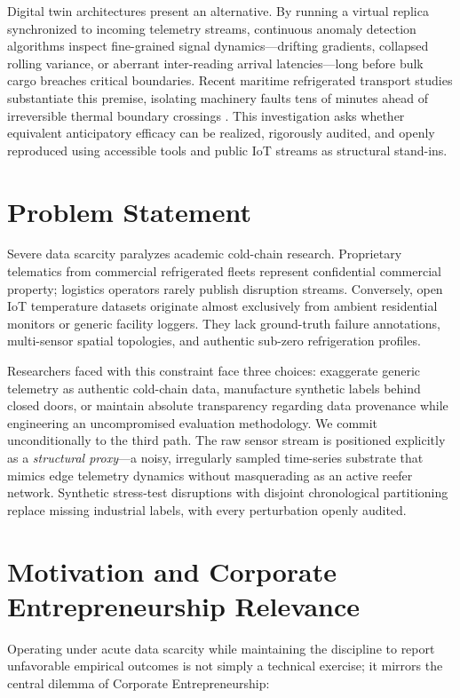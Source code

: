 \documentclass[11pt,a4paper,oneside]{report}
\begin{document}
Digital twin architectures present an alternative. By running a virtual replica synchronized to incoming telemetry streams, continuous anomaly detection algorithms inspect fine-grained signal dynamics---drifting gradients, collapsed rolling variance, or aberrant inter-reading arrival latencies---long before bulk cargo breaches critical boundaries. Recent maritime refrigerated transport studies substantiate this premise, isolating machinery faults tens of minutes ahead of irreversible thermal boundary crossings \parencite{vuksic2026early}. This investigation asks whether equivalent anticipatory efficacy can be realized, rigorously audited, and openly reproduced using accessible tools and public IoT streams as structural stand-ins.

\section{Problem Statement}
\label{sec:problem_statement}

Severe data scarcity paralyzes academic cold-chain research. Proprietary telematics from commercial refrigerated fleets represent confidential commercial property; logistics operators rarely publish disruption streams. Conversely, open IoT temperature datasets originate almost exclusively from ambient residential monitors or generic facility loggers. They lack ground-truth failure annotations, multi-sensor spatial topologies, and authentic sub-zero refrigeration profiles.

Researchers faced with this constraint face three choices: exaggerate generic telemetry as authentic cold-chain data, manufacture synthetic labels behind closed doors, or maintain absolute transparency regarding data provenance while engineering an uncompromised evaluation methodology. We commit unconditionally to the third path. The raw sensor stream is positioned explicitly as a \emph{structural proxy}---a noisy, irregularly sampled time-series substrate that mimics edge telemetry dynamics without masquerading as an active reefer network. Synthetic stress-test disruptions with disjoint chronological partitioning replace missing industrial labels, with every perturbation openly audited.

\section{Motivation and Corporate Entrepreneurship Relevance}
\label{sec:motivation}

Operating under acute data scarcity while maintaining the discipline to report unfavorable empirical outcomes is not simply a technical exercise; it mirrors the central dilemma of Corporate Entrepreneurship:
\end{document}
